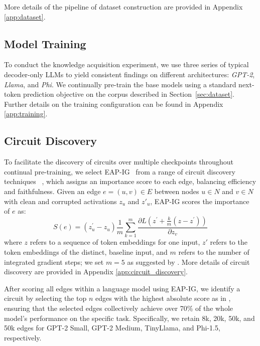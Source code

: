 More details of the pipeline of dataset construction are provided in Appendix \ref{app:dataset}.

\subsection{Model Training}

To conduct the knowledge acquisition experiment, we use three series of typical decoder-only LLMs to yield consistent findings on different architectures: \textit{GPT-2}, \textit{Llama}, and \textit{Phi}.
We continually pre-train the base models using a standard next-token prediction objective on the corpus described in Section~\ref{sec:dataset}.
Further details on the training configuration can be found in Appendix \ref{app:training}.

\subsection{Circuit Discovery}
\label{sec:circuit_discovery}

To facilitate the discovery of circuits over multiple checkpoints throughout continual pre-training, we select EAP-IG~\citep{eap-ig} from a range of circuit discovery techniques ~\citep{acdc,eap,information_flow_routes,eap-ig}, which assigns an importance score to each edge, balancing efficiency and faithfulness.
Given an edge $e=(u,v)\in{E}$ between nodes $u\in{N}$ and $v\in{N}$ with clean and corrupted activations $z_u$ and $z'_u$, EAP-IG scores the importance of $e$ as:
\begin{equation}
    S(e)=\left(z_u^{\prime}-z_u\right) \frac{1}{m} \sum_{k=1}^m \frac{\partial L\left(z^{\prime}+\frac{k}{m}\left(z-z^{\prime}\right)\right)}{\partial z_v}
    \label{eq:eap-ig}
\end{equation}
where $z$ refers to a sequence of token embeddings for one input, $z'$ refers to the token embeddings of the distinct, baseline input, and $m$ refers to the number of integrated gradient steps; we set $m=5$ as suggested by \citet{eap-ig}.
More details of circuit discovery are provided in Appendix \ref{app:circuit_discovery}.

After scoring all edges within a language model using EAP-IG, we identify a circuit by selecting the top $n$ edges with the highest absolute score as in \citet{eap}, ensuring that the selected edges collectively achieve over 70\% of the whole model's performance on the specific task.
Specifically, we retain 8k, 20k, 50k, and 50k edges for GPT-2 Small, GPT-2 Medium, TinyLlama, and Phi-1.5, respectively.
